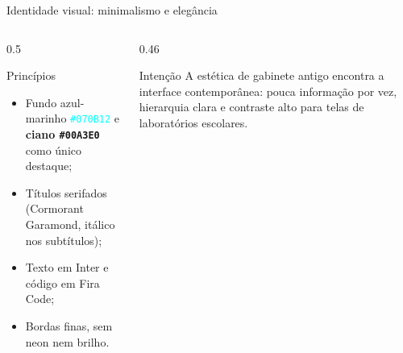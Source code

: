 \documentclass[aspectratio=169, 10pt, t]{beamer}
\begin{document}
\begin{frame}{Identidade visual: minimalismo e elegância}
  \begin{columns}[T]
    \begin{column}{0.5\textwidth}
      \begin{card}{Princípios}
        \begin{itemize}
          \item Fundo azul-marinho \textcolor{Cyan}{\texttt{\#070B12}} e \textbf{ciano \texttt{\#00A3E0}} como único destaque;
          \item Títulos serifados (Cormorant Garamond, itálico nos subtítulos);
          \item Texto em Inter e código em Fira Code;
          \item Bordas finas, sem neon nem brilho.
        \end{itemize}
      \end{card}
    \end{column}
    \begin{column}{0.46\textwidth}
      \begin{card}{Intenção}
        A estética de gabinete antigo encontra a interface contemporânea: pouca informação por vez, hierarquia clara e contraste alto para telas de laboratórios escolares.\\[0.5em]
        \colorbox{Bg}{\color{Cyan}\rule{0pt}{1.2ex}\hspace{1.4em}}\hspace{0.3em}\colorbox{Cyan}{\rule{0pt}{1.2ex}\hspace{1.4em}}
      \end{card}
    \end{column}
  \end{columns}
\end{frame}
\end{document}
